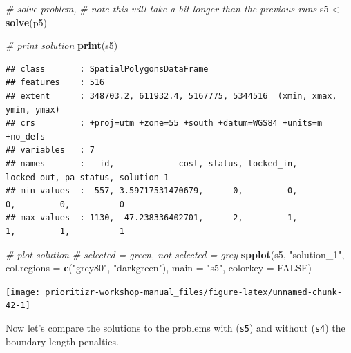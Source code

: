 \documentclass[
  12pt,
]{book}
\newenvironment{Shaded}{\begin{snugshade}}{\end{snugshade}}
\newcommand{\CommentTok}[1]{\textcolor[rgb]{0.56,0.35,0.01}{\textit{#1}}}
\newcommand{\DataTypeTok}[1]{\textcolor[rgb]{0.13,0.29,0.53}{#1}}
\newcommand{\KeywordTok}[1]{\textcolor[rgb]{0.13,0.29,0.53}{\textbf{#1}}}
\newcommand{\NormalTok}[1]{#1}
\newcommand{\OtherTok}[1]{\textcolor[rgb]{0.56,0.35,0.01}{#1}}
\newcommand{\StringTok}[1]{\textcolor[rgb]{0.31,0.60,0.02}{#1}}
\begin{document}
\begin{Shaded}
\begin{Highlighting}[]
\CommentTok{# solve problem,}
\CommentTok{# note this will take a bit longer than the previous runs}
\NormalTok{s5 <-}\StringTok{ }\KeywordTok{solve}\NormalTok{(p5)}

\CommentTok{# print solution}
\KeywordTok{print}\NormalTok{(s5)}
\end{Highlighting}
\end{Shaded}

\begin{verbatim}
## class       : SpatialPolygonsDataFrame 
## features    : 516 
## extent      : 348703.2, 611932.4, 5167775, 5344516  (xmin, xmax, ymin, ymax)
## crs         : +proj=utm +zone=55 +south +datum=WGS84 +units=m +no_defs 
## variables   : 7
## names       :   id,             cost, status, locked_in, locked_out, pa_status, solution_1 
## min values  :  557, 3.59717531470679,      0,         0,          0,         0,          0 
## max values  : 1130,  47.238336402701,      2,         1,          1,         1,          1
\end{verbatim}

\begin{Shaded}
\begin{Highlighting}[]
\CommentTok{# plot solution}
\CommentTok{# selected = green, not selected = grey}
\KeywordTok{spplot}\NormalTok{(s5, }\StringTok{"solution_1"}\NormalTok{, }\DataTypeTok{col.regions =} \KeywordTok{c}\NormalTok{(}\StringTok{"grey80"}\NormalTok{, }\StringTok{"darkgreen"}\NormalTok{), }\DataTypeTok{main =} \StringTok{"s5"}\NormalTok{,}
       \DataTypeTok{colorkey =} \OtherTok{FALSE}\NormalTok{)}
\end{Highlighting}
\end{Shaded}

\begin{center}\texttt{[image: prioritizr-workshop-manual\_files/figure-latex/unnamed-chunk-42-1]} \end{center}

Now let's compare the solutions to the problems with (\texttt{s5}) and without (\texttt{s4}) the boundary length penalties.
\end{document}
